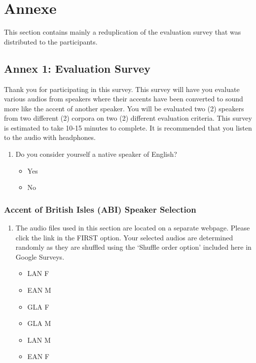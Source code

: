 \documentclass
[
    a4paper,
    twoside,
    12pt,
]
{report}
\begin{document}
\chapter{Annexe}

This section contains mainly a reduplication of the evaluation survey
that was distributed to the participants.

\hypertarget{annex-1-evaluation-survey}{%
\section{Annex 1: Evaluation Survey}\label{annex-1-evaluation-survey}}

Thank you for participating in this survey. This survey will have you
evaluate various audios from speakers where their accents have been
converted to sound more like the accent of another speaker. You will be
evaluated two (2) speakers from two different (2) corpora on two (2)
different evaluation criteria. This survey is estimated to take 10-15
minutes to complete. It is recommended that you listen to the audio with
headphones.

\begin{enumerate}
\def\labelenumi{\arabic{enumi}.}
\item
  Do you consider yourself a native speaker of English?

  \begin{itemize}
  \tightlist
  \item
    Yes
  \item
    No
  \end{itemize}
\end{enumerate}

\hypertarget{accent-of-british-isles-abi-speaker-selection}{%
\subsection{Accent of British Isles (ABI) Speaker
Selection}\label{accent-of-british-isles-abi-speaker-selection}}

\begin{enumerate}
\def\labelenumi{\arabic{enumi}.}
\setcounter{enumi}{1}
\item
  The audio files used in this section are located on a separate
  webpage. Please click the link in the FIRST option. Your selected
  audios are determined randomly as they are shuffled using the `Shuffle
  order option' included here in Google Surveys.

  \begin{itemize}
  \tightlist
  \item
    LAN F
  \item
    EAN M
  \item
    GLA F
  \item
    GLA M
  \item
    LAN M
  \item
    EAN F
  \end{itemize}
\end{enumerate}
\end{document}
